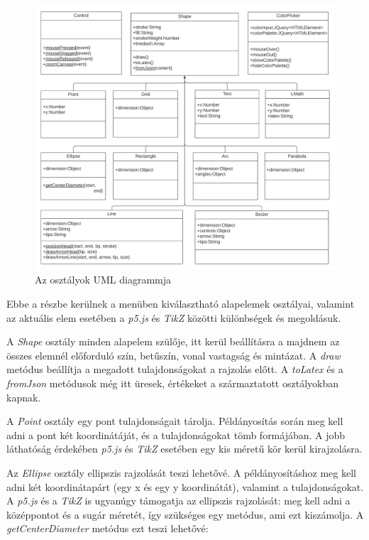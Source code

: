 \begin{figure}[!h]
	\centering
	\includegraphics[width=\textwidth]{images/uml.png}
	\caption{Az osztályok UML diagrammja}
	\label{fig:uml}
\end{figure}


Ebbe a részbe kerülnek a menüben kiválasztható alapelemek osztályai, valamint az aktuális elem esetében a  \textit{p5.js} és \textit{TikZ} közötti különbségek és megoldásuk. 


A \textit{Shape} osztály minden alapelem szülője, itt kerül beállításra a majdnem az összes elemnél előforduló szín, betűszín, vonal vastagság és mintázat. A \textit{draw} metódus beállítja a megadott tulajdonságokat a rajzolás előtt. A \textit{toLatex} és a \textit{fromJson} metódusok még itt üresek, értékeket a származtatott osztályokban kapnak.


A \textit{Point} osztály egy pont tulajdonságait tárolja. Példányosítás során meg kell adni a pont két koordinátáját, és a tulajdonságokat tömb formájában. A jobb láthatóság érdekében \textit{p5.js} és \textit{TikZ} esetében egy kis méretű kör kerül kirajzolásra. 


Az \textit{Ellipse} osztály ellipszis rajzolását teszi lehetővé. A példányosításhoz meg kell adni két koordinátapárt (egy x és egy y koordinátát), valamint a tulajdonságokat. A \textit{p5.js} és a \textit{TikZ} is ugyanúgy támogatja az ellipszis rajzolását: meg kell adni a középpontot és a sugár méretét, így szükséges egy metódus, ami ezt kiszámolja. A \textit{getCenterDiameter} metódus ezt teszi lehetővé:

